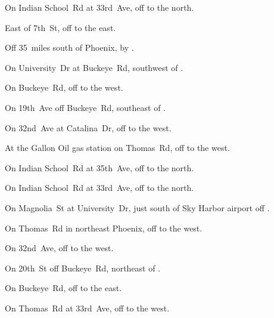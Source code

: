 
\begin{LocationList}

On Indian School~Rd at 33rd~Ave, off   to the north.

East of 7th~St, off   to the east.

Off  35~miles south of Phoenix, by  .

On University~Dr at Buckeye~Rd, southwest of  .

On Buckeye~Rd, off    to the west.

On 19th~Ave off Buckeye~Rd, southeast of   .

On 32nd~Ave at Catalina~Dr, off   to the west.

At the Gallon Oil gas station on Thomas~Rd, off   to the west.

\Location{\GarageHQ \Garage}
On Indian School~Rd at 35th~Ave, off   to the north.

On Indian School~Rd at 33rd~Ave, off   to the north.

On Magnolia~St at University~Dr, just south of Sky Harbor airport off  .

On Thomas~Rd in northeast Phoenix, off   to the west.

\Location{\RecruitmentAgency \Recruitment}
On 32nd~Ave, off   to the west.

On 20th~St off Buckeye~Rd, northeast of   .

On Buckeye~Rd, off    to the east.

On Thomas~Rd at 33rd~Ave, off   to the west.

\end{LocationList}
